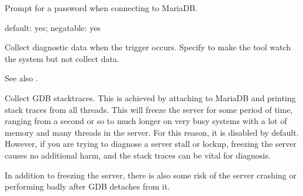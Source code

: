 \documentclass[letterpaper,10pt,english]{sphinxmanual}
\begin{document}
\begin{fulllineitems}
\label{\detokenize{mariadb-stat:cmdoption-mariadb-stat-ask-pass}}
Prompt for a password when connecting to MariaDB.

\end{fulllineitems}


\begin{fulllineitems}
\label{\detokenize{mariadb-stat:cmdoption-mariadb-stat-collect}}
default: yes; negatable: yes

Collect diagnostic data when the trigger occurs.  Specify 
to make the tool watch the system but not collect data.

See also {\hyperref[\detokenize{mariadb-stat:cmdoption-mariadb-stat-stalk}]{}}.

\end{fulllineitems}


\begin{fulllineitems}
\label{\detokenize{mariadb-stat:cmdoption-mariadb-stat-collect-gdb}}
Collect GDB stacktraces.  This is achieved by attaching to MariaDB and printing
stack traces from all threads. This will freeze the server for some period of
time, ranging from a second or so to much longer on very busy systems with a lot
of memory and many threads in the server.  For this reason, it is disabled by
default. However, if you are trying to diagnose a server stall or lockup,
freezing the server causes no additional harm, and the stack traces can be vital
for diagnosis.

In addition to freezing the server, there is also some risk of the server
crashing or performing badly after GDB detaches from it.

\end{fulllineitems}
\end{document}
